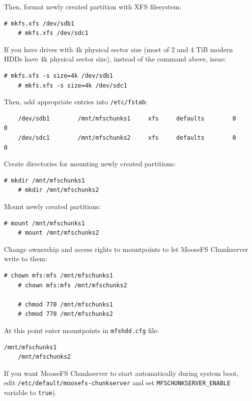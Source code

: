 \documentclass[a4paper,11pt,english]{report}
\def\code#1{\texttt{#1}}
\begin{document}
			Then, format newly created partition with XFS filesystem:
			\begin{lstlisting}[caption={Formatting partitions}]
	# mkfs.xfs /dev/sdb1
	# mkfs.xfs /dev/sdc1
			\end{lstlisting}
			
			If you have drives with 4k physical sector size (most of 2 and 4 TiB modern HDDs have 4k physical sector size), instead of the command above, issue:
			\begin{lstlisting}[caption={Formatting partitions with \code{4k} block size}]
	# mkfs.xfs -s size=4k /dev/sdb1
	# mkfs.xfs -s size=4k /dev/sdc1
			\end{lstlisting}
			
			Then, add appropriate entries into \code{/etc/fstab}:
			\begin{lstlisting}
	/dev/sdb1        /mnt/mfschunks1     xfs     defaults        0       0
	/dev/sdc1        /mnt/mfschunks2     xfs     defaults        0       0
			\end{lstlisting}
			
			Create directories for mounting newly created partitions:
			\begin{lstlisting}[caption={Creating directories}]
	# mkdir /mnt/mfschunks1
	# mkdir /mnt/mfschunks2
			\end{lstlisting}
			
			Mount newly created partitions:
			\begin{lstlisting}[caption={Mounting partitions}]
	# mount /mnt/mfschunks1
	# mount /mnt/mfschunks2
			\end{lstlisting}
			
			Change ownership and access rights to mountpoints to let MooseFS Chunkserver write to them:
			
			\begin{lstlisting}[caption={Changing ownership}]
	# chown mfs:mfs /mnt/mfschunks1
	# chown mfs:mfs /mnt/mfschunks2
	
	# chmod 770 /mnt/mfschunks1
	# chmod 770 /mnt/mfschunks2
			\end{lstlisting}
			
			At this point enter mountpoints in \code{mfshdd.cfg} file:
			\begin{lstlisting}[caption={Contents of mfshdd.cfg file}]
	/mnt/mfschunks1
	/mnt/mfschunks2
			\end{lstlisting}
			
			If you want MooseFS Chunkserver to start automatically during system boot, \\
			edit \code{/etc/default/moosefs-chunkserver} and set \code{MFSCHUNKSERVER\_ENABLE} variable to \code{true}).
			
\end{document}

